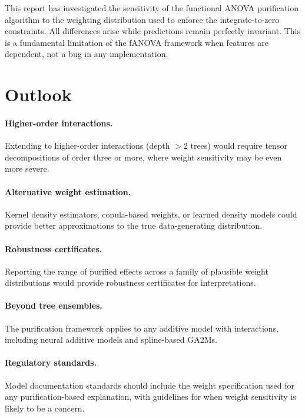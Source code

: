 This report has investigated the sensitivity of the functional ANOVA purification algorithm to the weighting distribution used to enforce the integrate-to-zero constraints.
All differences arise while predictions remain perfectly invariant.
This is a fundamental limitation of the fANOVA framework when features are dependent, not a bug in any implementation.

\section{Outlook}

\paragraph{Higher-order interactions.}
Extending to higher-order interactions (depth $>2$ trees) would require tensor decompositions of order three or more, where weight sensitivity may be even more severe.

\paragraph{Alternative weight estimation.}
Kernel density estimators, copula-based weights, or learned density models could provide better approximations to the true data-generating distribution.

\paragraph{Robustness certificates.}
Reporting the range of purified effects across a family of plausible weight distributions would provide robustness certificates for interpretations.

\paragraph{Beyond tree ensembles.}
The purification framework applies to any additive model with interactions, including neural additive models \citep{agarwal2021neural} and spline-based GA2Ms.

\paragraph{Regulatory standards.}
Model documentation standards should include the weight specification used for any purification-based explanation, with guidelines for when weight sensitivity is likely to be a concern.
